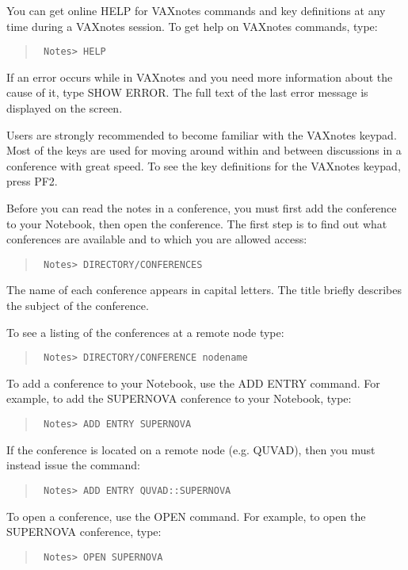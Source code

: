 You can get online HELP for VAXnotes commands and key definitions
at any time during a VAXnotes session.  
To get help on VAXnotes commands, type:

\begin{quote}\tt
Notes> HELP
\end{quote}

If an error occurs while in VAXnotes and you need more information
about the cause of it, type SHOW ERROR.  The full text of the last
error message is displayed on the screen.

Users are strongly recommended to become familiar with the VAXnotes keypad.
Most of the keys are used for moving around within and between 
discussions in a conference with great speed.
To see the key definitions for the VAXnotes keypad, press PF2.  

Before you can read the notes in a conference, you must first add the
conference to your Notebook, then open the conference. The first step is
to find out what conferences are available and to which you are allowed access:

\begin{quote}\tt
Notes> DIRECTORY/CONFERENCES
\end{quote}

The name of each conference appears in capital letters.  The title briefly
describes the subject of the conference.

To see a listing of the conferences at a remote node type: 

\begin{quote}\tt
Notes> DIRECTORY/CONFERENCE nodename
\end{quote}

To add a conference to your Notebook, use the ADD ENTRY command.  For
example, to add the SUPERNOVA conference to your Notebook, type:

\begin{quote}\tt
Notes> ADD ENTRY SUPERNOVA
\end{quote}

If the conference is located on a remote node (e.g. QUVAD), then
you must instead issue the command:

\begin{quote}\tt
Notes> ADD ENTRY QUVAD::SUPERNOVA
\end{quote}

To open a conference, use the OPEN command.  For example, to open the
SUPERNOVA conference, type:

\begin{quote}\tt
Notes> OPEN SUPERNOVA
\end{quote}

